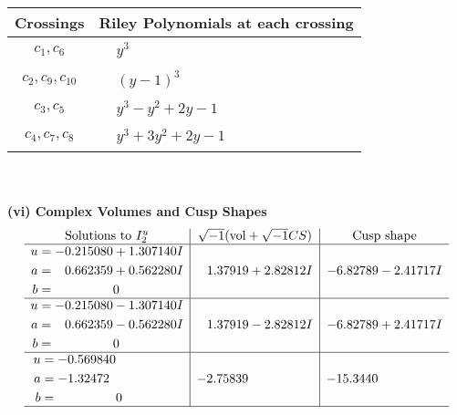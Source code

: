 \documentclass[1p]{elsarticle_modified}
\theoremstyle{definition}
\newcommand{\I}{\sqrt{-1}}
\begin{document}
\begin{tabular}{m{50pt}|m{274pt}}
Crossings & \hspace{64pt}Riley Polynomials at each crossing \\
\hline $$\begin{aligned}c_{1},c_{6}\end{aligned}$$&$\begin{aligned}
&y^3
\end{aligned}$\\
\hline $$\begin{aligned}c_{2},c_{9},c_{10}\end{aligned}$$&$\begin{aligned}
&(y-1)^3
\end{aligned}$\\
\hline $$\begin{aligned}c_{3},c_{5}\end{aligned}$$&$\begin{aligned}
&y^3- y^2+2 y-1
\end{aligned}$\\
\hline $$\begin{aligned}c_{4},c_{7},c_{8}\end{aligned}$$&$\begin{aligned}
&y^3+3 y^2+2 y-1
\end{aligned}$\\
\hline
\end{tabular}\\~\\
\newpage\flushleft \textbf{(vi) Complex Volumes and Cusp Shapes}
$$\begin{array}{c|c|c}  
\text{Solutions to }I^u_{2}& \I (\text{vol} + \sqrt{-1}CS) & \text{Cusp shape}\\
 \hline 
\begin{aligned}
u &= -0.215080 + 1.307140 I \\
a &= \phantom{-}0.662359 + 0.562280 I \\
b &= \phantom{-0.000000 } 0\end{aligned}
 & \phantom{-}1.37919 + 2.82812 I & -6.82789 - 2.41717 I \\ \hline\begin{aligned}
u &= -0.215080 - 1.307140 I \\
a &= \phantom{-}0.662359 - 0.562280 I \\
b &= \phantom{-0.000000 } 0\end{aligned}
 & \phantom{-}1.37919 - 2.82812 I & -6.82789 + 2.41717 I \\ \hline\begin{aligned}
u &= -0.569840\phantom{ +0.000000I} \\
a &= -1.32472\phantom{ +0.000000I} \\
b &= \phantom{-0.000000 } 0\end{aligned}
 & -2.75839\phantom{ +0.000000I} & -15.3440\phantom{ +0.000000I}\\
 \hline 
 \end{array}$$\newpage
\end{document}
